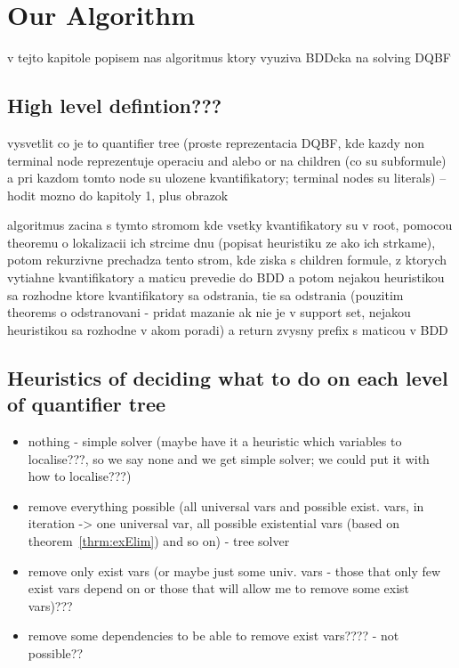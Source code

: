 \documentclass[
  digital, %
  twoside, %
  table,   %
  nolof,     %
  nolot,     %
]{fithesis3}
\theoremstyle{definition}
\theoremstyle{remark}
\begin{document}
\chapter{Our Algorithm}
\label{chap:algorithm}

v tejto kapitole popisem nas algoritmus ktory vyuziva BDDcka na solving DQBF

\section{High level defintion???}
vysvetlit co je to quantifier tree (proste reprezentacia DQBF, kde kazdy non terminal node reprezentuje operaciu and alebo or na children (co su subformule) a pri kazdom tomto node su ulozene kvantifikatory; terminal nodes su literals) -- hodit mozno do kapitoly 1, plus obrazok

algoritmus zacina s tymto stromom kde vsetky kvantifikatory su v root, pomocou theoremu o lokalizacii ich strcime dnu (popisat heuristiku ze ako ich strkame), potom rekurzivne prechadza tento strom, kde ziska s children formule, z ktorych vytiahne kvantifikatory a maticu prevedie do BDD a potom nejakou heuristikou sa rozhodne ktore kvantifikatory sa odstrania, tie sa odstrania (pouzitim theorems o odstranovani - pridat mazanie ak nie je v support set, nejakou heuristikou sa rozhodne v akom poradi) a return zvysny prefix s maticou v BDD

\section{Heuristics of deciding what to do on each level of quantifier tree}
\begin{itemize}
    \item nothing - simple solver (maybe have it a heuristic which variables to localise???, so we say none and we get simple solver; we could put it with how to localise???)
    \item remove everything possible (all universal vars and possible exist. vars, in iteration -> one universal var, all possible existential vars (based on theorem~\ref{thrm:exElim}) and so on) - tree solver
    \item remove only exist vars (or maybe just some univ. vars - those that only few exist vars depend on or those that will allow me to remove some exist vars)???
    \item remove some dependencies to be able to remove exist vars???? - not possible??
\end{itemize}
\end{document}
